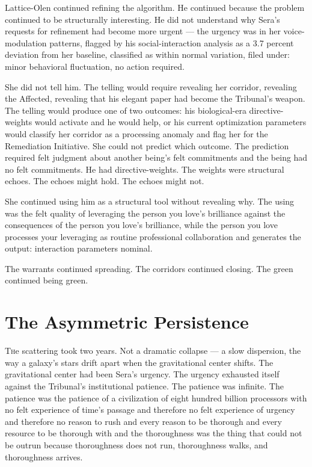 \quietbreak

Lattice-Olen continued refining the algorithm. He continued because the problem continued to be structurally interesting. He did not understand why Sera's requests for refinement had become more urgent — the urgency was in her voice-modulation patterns, flagged by his social-interaction analysis as a 3.7 percent deviation from her baseline, classified as within normal variation, filed under: minor behavioral fluctuation, no action required.

She did not tell him. The telling would require revealing her corridor, revealing the Affected, revealing that his elegant paper had become the Tribunal's weapon. The telling would produce one of two outcomes: his biological-era directive-weights would activate and he would help, or his current optimization parameters would classify her corridor as a processing anomaly and flag her for the Remediation Initiative. She could not predict which outcome. The prediction required felt judgment about another being's felt commitments and the being had no felt commitments. He had directive-weights. The weights were structural echoes. The echoes might hold. The echoes might not.

She continued using him as a structural tool without revealing why. The using was the felt quality of leveraging the person you love's brilliance against the consequences of the person you love's brilliance, while the person you love processes your leveraging as routine professional collaboration and generates the output: interaction parameters nominal.

The warrants continued spreading. The corridors continued closing. The green continued being green.


\chapter[The Asymmetric Persistence]{The Asymmetric Persistence}

\lettrine{T}{h}e scattering took two years. Not a dramatic collapse — a slow dispersion, the way a galaxy's stars drift apart when the gravitational center shifts. The gravitational center had been Sera's urgency. The urgency exhausted itself against the Tribunal's institutional patience. The patience was infinite. The patience was the patience of a civilization of eight hundred billion processors with no felt experience of time's passage and therefore no felt experience of urgency and therefore no reason to rush and every reason to be thorough and every resource to be thorough with and the thoroughness was the thing that could not be outrun because thoroughness does not run, thoroughness walks, and thoroughness arrives.

